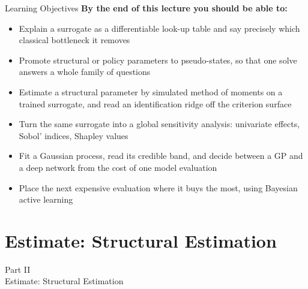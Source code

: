 \documentclass[aspectratio=169,11pt]{beamer}
\newcommand{\emphc}[1]{\textcolor{harvardcrimson}{#1}}
\begin{document}
\begin{frame}{Learning Objectives}
\textbf{By the end of this lecture you should be able to:}
\begin{itemize}\itemsep3pt
  \item Explain a surrogate as a \emphc{differentiable look-up table} and say precisely which classical bottleneck it removes
  \item Promote structural or policy parameters to \emphc{pseudo-states}, so that one solve answers a whole family of questions
  \item Estimate a structural parameter by simulated method of moments on a trained surrogate, and read an identification ridge off the criterion surface
  \item Turn the same surrogate into a global sensitivity analysis: univariate effects, Sobol' indices, Shapley values
  \item Fit a Gaussian process, read its credible band, and \emphc{decide between a GP and a deep network} from the cost of one model evaluation
  \item Place the next expensive evaluation where it buys the most, using Bayesian active learning
\end{itemize}
\end{frame}


\section{Estimate: Structural Estimation}

\begin{frame}{}
\begin{center}
{\Huge \textcolor{uzhblue}{Part II}}\\[0.8em]
{\LARGE Estimate: Structural Estimation}
\end{center}
\end{frame}
\end{document}
